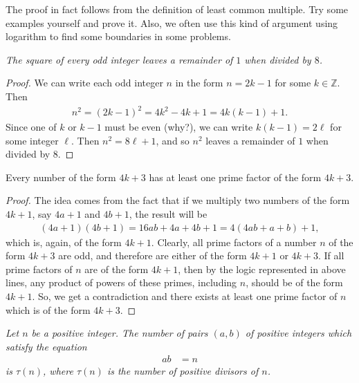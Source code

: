 \documentclass{subfile}
\begin{document}
	The proof in fact follows from the definition of least common multiple. Try some examples yourself and prove it. Also, we often use this kind of argument using logarithm to find some boundaries in some problems.

	\begin{theorem}\slshape
		The square of every odd integer leaves a remainder of $1$ when divided by $8$.
	\end{theorem}

	\begin{proof}
		We can write each odd integer $n$ in the form $n=2k-1$ for some $k\in\mathbb{Z}$. Then
		\begin{align*}
			n^2 = (2k-1)^2  = 4k^2-4k+1 = 4k(k-1)+1.
		\end{align*}
		Since one of $k$ or $k-1$ must be even (why?), we can write $k(k-1)=2\ell$ for some integer $\ell$. Then $n^2=8\ell+1$, and so $n^2$ leaves a remainder of $1$ when divided by $8$.
	\end{proof}

	\begin{theorem}\label{thm:4k+3prime}
		Every number of the form $4k+3$ has at least one prime factor of the form $4k+3$.
	\end{theorem}

	\begin{proof}
		The idea comes from the fact that if we multiply two numbers of the form $4k+1$, say $4a+1$ and $4b+1$, the result will be
		\begin{align*}
			(4a+1)(4b+1)=16ab+4a+4b+1=4(4ab+a+b)+1,
		\end{align*}
		which is, again, of the form $4k+1$. Clearly, all prime factors of a number $n$ of the form $4k+3$ are odd, and therefore are either of the form $4k+1$ or $4k+3$. If all prime factors of $n$ are of the form $4k+1$, then by the logic represented in above lines, any product of powers of these primes, including $n$, should be of the form $4k+1$. So, we get a contradiction and there exists at least one prime factor of $n$ which is of the form $4k+3$.
	\end{proof}
	\begin{theorem}\slshape\label{thm:nos}
		Let $n$ be a positive integer. The number of pairs $(a,b)$ of positive integers which satisfy the equation
		\begin{align*}
			ab & = n
		\end{align*}
		is $\tau(n)$, where $\tau(n)$ is the number of positive divisors of $n$.
	\end{theorem}
\end{document}

